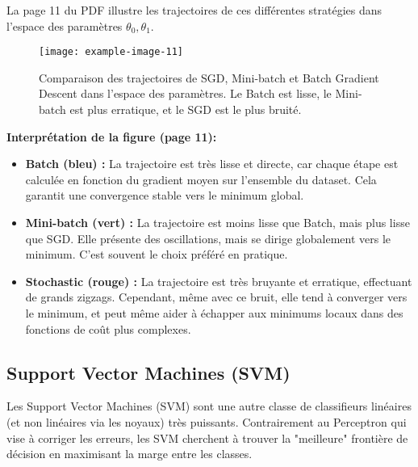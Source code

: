\documentclass{article}
\begin{document}
La page 11 du PDF illustre les trajectoires de ces différentes stratégies dans l'espace des paramètres $\theta_0, \theta_1$.
\begin{figure}[h!]
    \centering
    \texttt{[image: example-image-11]} %
    \caption{Comparaison des trajectoires de SGD, Mini-batch et Batch Gradient Descent dans l'espace des paramètres. Le Batch est lisse, le Mini-batch est plus erratique, et le SGD est le plus bruité.}
\end{figure}
\textbf{Interprétation de la figure (page 11):}
\begin{itemize}
    \item \textbf{Batch (bleu) :} La trajectoire est très lisse et directe, car chaque étape est calculée en fonction du gradient moyen sur l'ensemble du dataset. Cela garantit une convergence stable vers le minimum global.
    \item \textbf{Mini-batch (vert) :} La trajectoire est moins lisse que Batch, mais plus lisse que SGD. Elle présente des oscillations, mais se dirige globalement vers le minimum. C'est souvent le choix préféré en pratique.
    \item \textbf{Stochastic (rouge) :} La trajectoire est très bruyante et erratique, effectuant de grands zigzags. Cependant, même avec ce bruit, elle tend à converger vers le minimum, et peut même aider à échapper aux minimums locaux dans des fonctions de coût plus complexes.
\end{itemize}

\subsection{Support Vector Machines (SVM)}
Les Support Vector Machines (SVM) sont une autre classe de classifieurs linéaires (et non linéaires via les noyaux) très puissants. Contrairement au Perceptron qui vise à corriger les erreurs, les SVM cherchent à trouver la "meilleure" frontière de décision en maximisant la marge entre les classes.
\end{document}
